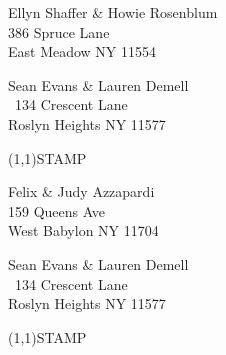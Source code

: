 \documentclass[12pt]{article}
\begin{document}
\begin{center} \begin{Huge} \vspace*{\fill}
Ellyn Shaffer \& Howie Rosenblum\\
386 Spruce Lane\\
East Meadow NY 11554\\
\vspace{\fill} \end{Huge} \end{center}

\clearpage

\begin{minipage}{.5\linewidth} \noindent
Sean Evans \& Lauren Demell\\\ 
134 Crescent Lane\\ 
Roslyn Heights NY 11577
\end{minipage}
\begin{minipage}{.5\linewidth \hspace{-.2in} \vspace{-.3in}}
\begin{flushright}
\framebox(1,1){STAMP}
\end{flushright}
\end{minipage}

\begin{center} \begin{Huge} \vspace*{\fill}
Felix \& Judy Azzapardi\\
159 Queens Ave\\
West Babylon NY 11704\\
\vspace{\fill} \end{Huge} \end{center}

\clearpage

\begin{minipage}{.5\linewidth} \noindent
Sean Evans \& Lauren Demell\\\ 
134 Crescent Lane\\ 
Roslyn Heights NY 11577
\end{minipage}
\begin{minipage}{.5\linewidth \hspace{-.2in} \vspace{-.3in}}
\begin{flushright}
\framebox(1,1){STAMP}
\end{flushright}
\end{minipage}
\end{document}
